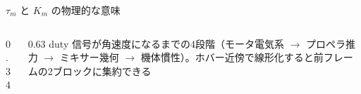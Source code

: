 \newlength{\tauKmCardH}\setlength{\tauKmCardH}{1.7cm}
\begin{frame}{$\tau_m$ と $K_m$ の物理的な意味\later}
  \vspace{-1mm}
  \begin{columns}[c]
    \begin{column}{0.34\textwidth}
      \centering
    \end{column}
    \begin{column}{0.63\textwidth}
      \footnotesize duty 信号が角速度になるまでの4段階（モータ電気系 $\to$ プロペラ推力
      $\to$ ミキサー幾何 $\to$ 機体慣性）。ホバー近傍で線形化すると前フレームの2ブロックに集約できる
    \end{column}
  \end{columns}

  \vspace{0.2em}


\end{frame}
